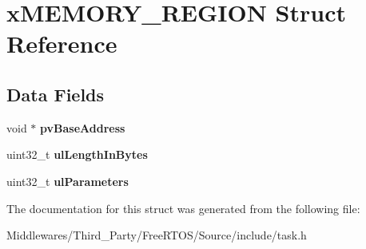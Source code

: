 \hypertarget{structx_m_e_m_o_r_y___r_e_g_i_o_n}{}\section{x\+M\+E\+M\+O\+R\+Y\+\_\+\+R\+E\+G\+I\+ON Struct Reference}
\label{structx_m_e_m_o_r_y___r_e_g_i_o_n}
\subsection*{Data Fields}
\begin{DoxyCompactItemize}
\item 
\mbox{\label{structx_m_e_m_o_r_y___r_e_g_i_o_n_a5c540d9e8ba79b50b9600f7225d41268}} 
void $\ast$ {\bfseries pv\+Base\+Address}
\item 
\mbox{\label{structx_m_e_m_o_r_y___r_e_g_i_o_n_a53924a8e3f7db81a7803b646573864c6}} 
uint32\+\_\+t {\bfseries ul\+Length\+In\+Bytes}
\item 
\mbox{\label{structx_m_e_m_o_r_y___r_e_g_i_o_n_a8339f23aad15c6b829547a17f839f32c}} 
uint32\+\_\+t {\bfseries ul\+Parameters}
\end{DoxyCompactItemize}


The documentation for this struct was generated from the following file\+:\begin{DoxyCompactItemize}
\item 
Middlewares/\+Third\+\_\+\+Party/\+Free\+R\+T\+O\+S/\+Source/include/task.\+h\end{DoxyCompactItemize}
